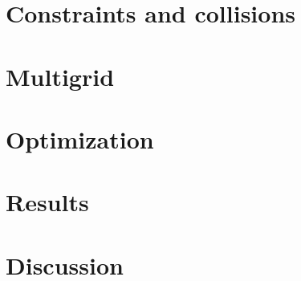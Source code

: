 \section{Constraints and collisions}
\label{sec:constraints}


\section{Multigrid}
\label{sec:multigrid}


\section{Optimization}
\label{sec:implementation}


\section{Results}
\label{sec:results}


\section{Discussion}
\label{sec:discussion}

